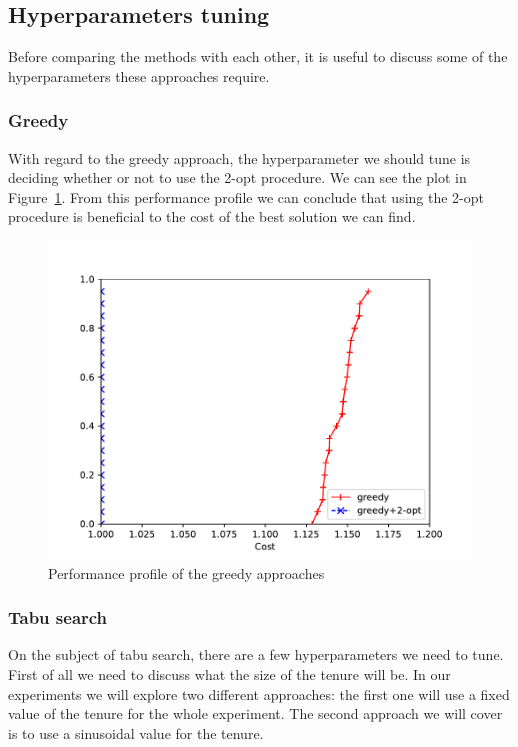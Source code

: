 \documentclass{article}
\begin{document}

\subsection{Hyperparameters tuning}
Before comparing the methods with each other, it is useful to discuss some
of the hyperparameters these approaches require.

\subsubsection{Greedy}
With regard to the greedy approach, the hyperparameter we should tune is
deciding whether or not to use the 2-opt procedure. We can see the plot
in Figure~\ref{fig:ht_greedy}. From this performance profile we can conclude
that using the 2-opt procedure is beneficial to the cost of the best
solution we can find.

\begin{figure}[ht]
        \caption{Performance profile of the greedy approaches}
        \label{fig:ht_greedy}
        \centering
        \includegraphics[width=340pt]{assets/ht_greedy.pdf}
\end{figure}

\clearpage

\subsubsection{Tabu search}
On the subject of tabu search, there are a few hyperparameters we need to tune.
First of all we need to discuss what the size of the tenure will be. In our
experiments we will explore two different approaches: the first one will use
a fixed value of the tenure for the whole experiment. The second approach we
will cover is to use a sinusoidal value for the tenure.
\end{document}
